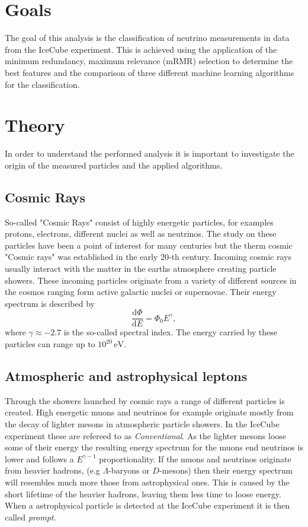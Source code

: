 \section{Goals}
The goal of this analysis is the classification of neutrino measurements in data from the IceCube experiment. 
This is achieved using the application of the minimum redundancy, maximum relevance (mRMR) selection to determine the best features and the comparison of three different machine learning algorithms for the classification.


\section{Theory}
\label{sec:Theory}
In order to understand the performed analysis it is important to investigate the origin of the measured particles and the applied algorithms. 

\subsection{Cosmic Rays}
So-called "Cosmic Rays" consist of highly energetic particles, for examples protons, electrons, different nuclei as well as neutrinos. 
The study on these particles have been a point of interest for many centuries but the therm cosmic "Cosmic rays" was established in the early 20-th century. 
Incoming cosmic rays usually interact with the matter in the earths atmosphere creating particle showers. 
These incoming particles originate from a variety of different sources in the cosmos ranging form active galactic nuclei or supernovae.
Their energy spectrum is described by
\begin{equation*}
	\frac{\mathrm{d}\Phi}{\mathrm{d}E} = \Phi_0 E^\gamma,
\end{equation*}
where $\gamma \approx -2.7$ is the so-called spectral index. 
The energy carried by these particles can range up to $10^{20}\,\unit{\eV}$.


\subsection{Atmospheric and astrophysical leptons}
Through the showers launched by cosmic rays a range of different particles is created. 
High energetic muons and neutrinos for example originate mostly from the decay of lighter mesons in atmospheric particle showers. 
In the IceCube experiment these are refereed to as \textit{Conventional}. 
As the lighter mesons loose some of their energy the resulting energy spectrum for the muons 
end neutrinos is lower and follows a $E^{\gamma-1}$ proportionality. 
If the muons and neutrinos originate from heavier hadrons, 
(e.g $\Lambda$-baryons or $D$-mesons) then their energy spectrum will resembles much more those from astrophysical ones. 
This is caused by the short lifetime of the heavier hadrons, leaving them less time to loose energy.
When a astrophysical particle is detected at the IceCube experiment it is then called \textit{prompt}.

